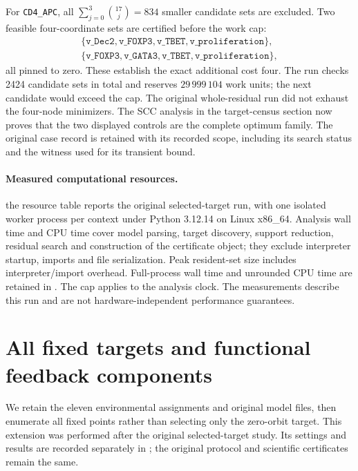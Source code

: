 For \texttt{CD4\_APC}, all
$\sum_{j=0}^{3}\binom{17}{j}=834$ smaller candidate sets are excluded.
Two feasible four-coordinate sets are certified before the work cap:
\[
\begin{gathered}
 \{\texttt{v\_Dec2},\texttt{v\_FOXP3},\texttt{v\_TBET},
       \texttt{v\_proliferation}\},\\
 \{\texttt{v\_FOXP3},\texttt{v\_GATA3},\texttt{v\_TBET},
       \texttt{v\_proliferation}\},
\end{gathered}
\]
all pinned to zero. These establish the exact additional cost four.
The run checks 2424 candidate sets in total and reserves
$29\,999\,104$ work units; the next candidate would exceed the cap.
The original whole-residual run did not exhaust the four-node minimizers. The SCC analysis in the target-census section now proves that the two displayed controls are the complete optimum family. The original case record is retained with its recorded scope, including its search status and the witness used for its transient bound.

\paragraph{Measured computational resources.}
the resource table reports the original selected-target run, with one isolated worker process per
context under Python 3.12.14 on Linux x86\_64. Analysis wall time and
CPU time cover model parsing, target discovery, support reduction,
residual search and construction of the certificate object; they exclude
interpreter startup, imports and file serialization. Peak resident-set
size includes interpreter/import overhead. Full-process wall time and
unrounded CPU time are retained in . The cap applies
to the analysis clock. The measurements describe this run and are not
hardware-independent performance guarantees.





\section{All fixed targets and functional feedback components}\label{sec:alltargets}
We retain the eleven environmental assignments and original model files,
then enumerate all fixed points rather than selecting only the zero-orbit
target. This extension was performed after the original selected-target
study. Its settings and results are recorded separately in
; the original protocol and scientific
certificates remain the same.

